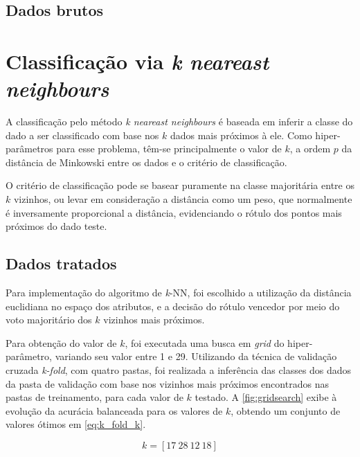 \subsection{Dados brutos}







\clearpage
\section{Classificação via \textit{k neareast neighbours}}

A classificação pelo método \textit{k neareast neighbours} é baseada em inferir a classe do dado a ser classificado com base nos $k$ dados mais próximos à ele. Como hiper-parâmetros para esse problema, têm-se principalmente o valor de $k$, a ordem $p$ da distância de Minkowski entre os dados e o critério de classificação.

O critério de classificação pode se basear puramente na classe majoritária entre os $k$ vizinhos, ou levar em consideração a distância como um peso, que normalmente é inversamente proporcional a distância, evidenciando o rótulo dos pontos mais próximos do dado teste.


\subsection{Dados tratados}

Para implementação do algoritmo de \textit{k}-NN, foi escolhido a utilização da distância euclidiana no espaço dos atributos, e a decisão do rótulo vencedor por meio do voto majoritário dos $k$ vizinhos mais próximos.

Para obtenção do valor de $k$, foi executada uma busca em \textit{grid} do hiper-parâmetro, variando seu valor entre 1 e 29. Utilizando da técnica de validação cruzada \textit{k-fold}, com quatro pastas, foi realizada a inferência das classes dos dados da pasta de validação com base nos vizinhos mais próximos encontrados nas pastas de treinamento, para cada valor de $k$ testado. A \autoref{fig:gridsearch} exibe à evolução da acurácia balanceada para os valores de $k$, obtendo um conjunto de valores ótimos em \eqref{eq:k_fold_k}.

\begin{equation}\label{eq:k_fold_k}
	k = [17\ 28\ 12\ 18]
\end{equation}


